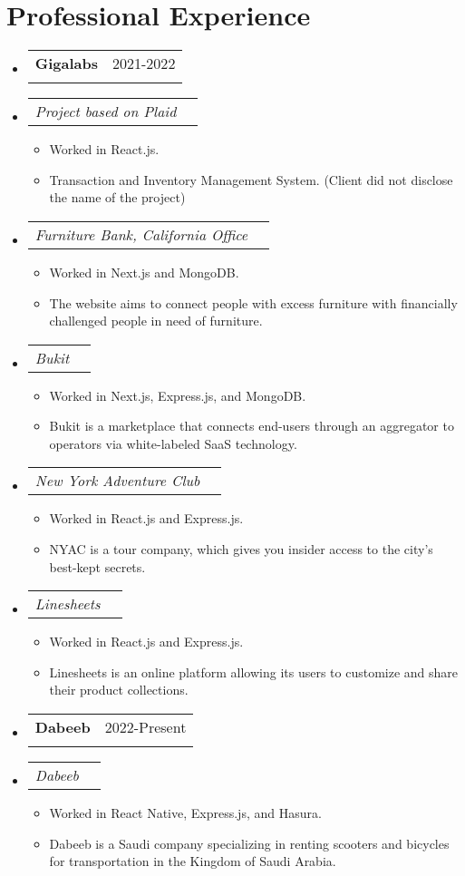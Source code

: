 \documentclass[letterpaper,11pt]{article}
\makeatletter
\newcommand{\resumeItem}[1]{
  \item\small{
    {#1 \vspace{-2pt}}
  }
}
\newcommand{\resumeSubheading}[4]{
  \vspace{-1pt}\item
    \begin{tabular*}{0.97\textwidth}[t]{l@{\extracolsep{\fill}}r}
      \textbf{#1} & #2 \\
      \textit{\small#3} & \textit{\small #4} \\
    \end{tabular*}\vspace{-6pt}
}
\newcommand{\resumeSubSubheading}[2]{
    \item
    \begin{tabular*}{0.97\textwidth}{l@{\extracolsep{\fill}}r}
      \textit{\small#1} & \textit{\small #2} \\
    \end{tabular*}\vspace{-6pt}
}
\newcommand{\resumeProjectHeading}[2]{
    \item
    \begin{tabular*}{0.97\textwidth}{l@{\extracolsep{\fill}}r}
      \small#1 & #2 \\
    \end{tabular*}\vspace{-5pt}
}
\newcommand{\resumeSubHeadingListStart}{\begin{itemize}[leftmargin=0.15in, label={}]}
\newcommand{\resumeSubHeadingListEnd}{\end{itemize}}
\newcommand{\resumeItemListStart}{\begin{itemize}}
\newcommand{\resumeItemListEnd}{\end{itemize}\vspace{-4pt}}
\makeatother
\begin{document}
\section{Professional Experience}
  \resumeSubHeadingListStart
    \resumeSubheading
      {Gigalabs}{2021-2022}{}{}\vspace{-12pt}
      \resumeSubSubheading{Project based on Plaid}{}
      \resumeItemListStart
        \resumeItem{Worked in React.js.}
        \resumeItem{Transaction and Inventory Management System. (Client did not disclose the name of the project)}
    \resumeItemListEnd
    \resumeSubSubheading{Furniture Bank, California Office}{}
      \resumeItemListStart
        \resumeItem{Worked in Next.js and MongoDB.}
        \resumeItem{The website aims to connect people with excess furniture with financially challenged people in need of furniture.}
    \resumeItemListEnd
    \resumeSubSubheading{Bukit}{}
      \resumeItemListStart
        \resumeItem{Worked in Next.js, Express.js, and MongoDB.}
        \resumeItem{Bukit is a marketplace that connects end-users through an aggregator to operators via white-labeled SaaS technology.}
    \resumeItemListEnd
    \resumeSubSubheading{New York Adventure Club}{}
      \resumeItemListStart
        \resumeItem{Worked in React.js and Express.js.}
        \resumeItem{NYAC is a tour company, which gives you insider access to the city’s best-kept secrets.}
    \resumeItemListEnd
    \resumeSubSubheading{Linesheets}{}
      \resumeItemListStart
        \resumeItem{Worked in React.js and Express.js.}
        \resumeItem{Linesheets is an online platform allowing its users to customize and share their product collections.}
    \resumeItemListEnd
    \resumeSubheading
      {Dabeeb}{2022-Present}{}{}\vspace{-12pt}
      \resumeSubSubheading{Dabeeb}{}
      \resumeItemListStart
        \resumeItem{Worked in React Native, Express.js, and Hasura.}
        \resumeItem{Dabeeb is a Saudi company specializing in renting scooters and bicycles for transportation in the Kingdom of Saudi Arabia.}
    \resumeItemListEnd
  \resumeSubHeadingListEnd


\end{document}
